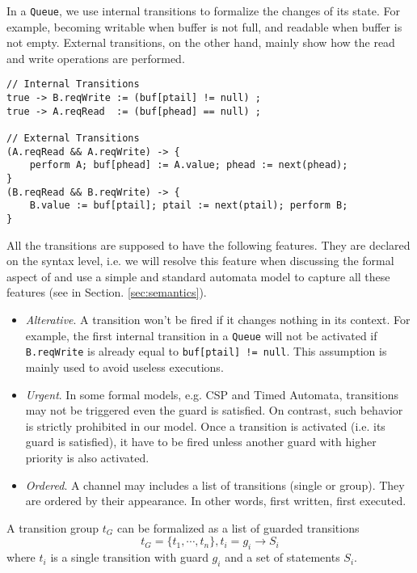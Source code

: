 \begin{example} In a \texttt{Queue}, we use internal transitions to formalize the changes of its state. For example, becoming writable when buffer is not full, and readable when buffer is not empty. External transitions, on the other hand, mainly show how the read and write operations are performed.
\begin{lstlisting}
// Internal Transitions
true -> B.reqWrite := (buf[ptail] != null) ;
true -> A.reqRead  := (buf[phead] == null) ;

// External Transitions
(A.reqRead && A.reqWrite) -> {
    perform A; buf[phead] := A.value; phead := next(phead);
}
(B.reqRead && B.reqWrite) -> {
    B.value := buf[ptail]; ptail := next(ptail); perform B;
}
\end{lstlisting}
\label{exp:trans_queue}
\end{example}

All the transitions are supposed to have the following features. They are declared on the syntax level, i.e. we will resolve this feature when discussing the formal aspect of \lang{} and use a simple and standard automata model to capture all these features (see in Section. \ref{sec:semantics}).

\begin{itemize}
    \item \emph{Alterative}. A transition won't be fired if it changes nothing in its context. For example, the first internal transition in a \texttt{Queue} will not be activated if \texttt{B.reqWrite} is already equal to \texttt{buf[ptail] != null}. This assumption is mainly used to avoid useless executions.
    \item \emph{Urgent}. In some formal models, e.g. CSP\cite{HoareCsp1985} and Timed Automata\cite{AlurTcs1994}, transitions may not be triggered even the guard is satisfied. On contrast, such behavior is strictly prohibited in our model. Once a transition is activated (i.e. its guard is satisfied), it have to be fired unless another guard with higher priority is also activated.
    \item \emph{Ordered}. A channel may includes a list of transitions (single or group). They are ordered by their appearance. In other words, first written, first executed. 
\end{itemize}

\begin{formalization}
    A transition group $t_G$ can be formalized as a list of guarded transitions
    \[
        t_G=\{t_1,\cdots, t_n\}, t_i=g_i\rightarrow S_i
    \]
    where $t_i$ is a single transition with guard $g_i$ and a set of statements $S_i$.
\end{formalization}

